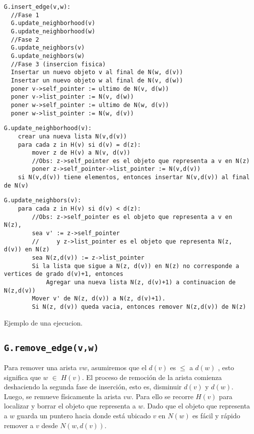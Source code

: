 \documentclass[a4paper,12pt]{article}
\begin{document}
\begin{lstlisting}
G.insert_edge(v,w):
  //Fase 1
  G.update_neighborhood(v)
  G.update_neighborhood(w)
  //Fase 2
  G.update_neighbors(v)
  G.update_neighbors(w)
  //Fase 3 (insercion fisica)
  Insertar un nuevo objeto v al final de N(w, d(v))
  Insertar un nuevo objeto w al final de N(v, d(w))
  poner v->self_pointer := ultimo de N(v, d(w))
  poner v->list_pointer := N(v, d(w))
  poner w->self_pointer := ultimo de N(w, d(v))
  poner w->list_pointer := N(w, d(v))
\end{lstlisting}

\begin{lstlisting}
G.update_neighborhood(v):
    crear una nueva lista N(v,d(v))
    para cada z in H(v) si d(v) = d(z):
        mover z de H(v) a N(v, d(v))
        //Obs: z->self_pointer es el objeto que representa a v en N(z)
        poner z->self_pointer->list_pointer := N(v,d(v))
    si N(v,d(v)) tiene elementos, entonces insertar N(v,d(v)) al final de N(v) 
\end{lstlisting}

\begin{lstlisting}
G.update_neighbors(v):
    para cada z in H(v) si d(v) < d(z):
        //Obs: z->self_pointer es el objeto que representa a v en N(z),
        sea v' := z->self_pointer
        //     y z->list_pointer es el objeto que representa N(z, d(v)) en N(z)
        sea N(z,d(v)) := z->list_pointer
        Si la lista que sigue a N(z, d(v)) en N(z) no corresponde a vertices de grado d(v)+1, entonces
            Agregar una nueva lista N(z, d(v)+1) a continuacion de N(z,d(v))
        Mover v' de N(z, d(v)) a N(z, d(v)+1).
        Si N(z, d(v)) queda vacia, entonces remover N(z,d(v)) de N(z)
\end{lstlisting}

Ejemplo de una ejecucion.

\subsection{\texttt{G.remove\_edge(v,w)}}

Para remover una arista $vw$, asumiremos que el $d(v)$ es ${\leq}$ a $d(w)$ , esto significa que  $w$ ${\in}$ $H(v)$.
El proceso de remoción de la arista comienza deshaciendo la segunda fase de inserción, esto es, disminuir $d(v)$ y  $d(w)$. Luego,  se remueve físicamente la arista $vw$. Para ello se recorre $H(v)$ para localizar y borrar el objeto que representa a $w$. Dado que el objeto que representa a $w$ guarda un puntero hacia donde está ubicado $v$ en $N(w)$ es fácil y rápido remover a $v$ desde $N(w,d(v))$.
\end{document}
